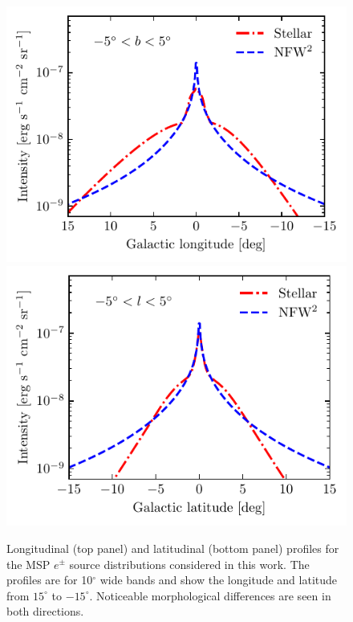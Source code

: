 \documentclass[doublespace,draft,nopageskip]{VTthesis} %
\begin{document}
\begin{figure}[t!]
  \includegraphics[width = \columnwidth]{Figures/IC_MSPs/injection_lon.pdf}
  \includegraphics[width = \columnwidth]{Figures/IC_MSPs/injection_lat.pdf}
  \caption{Longitudinal (top panel) and latitudinal (bottom panel)
    profiles for the MSP $e^\pm$ source distributions considered in this work. The profiles
    are for 10$^\circ$ wide bands and show the longitude and latitude
    from $15^\circ$ to $-15^\circ$. Noticeable morphological differences are seen in both directions.}
  \label{fig:injection_profile}
\end{figure}
\end{document}
